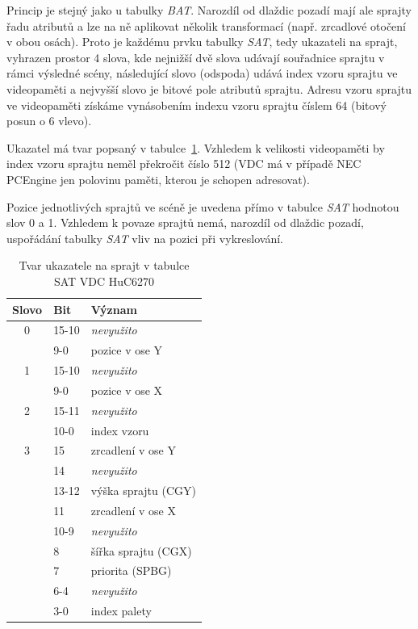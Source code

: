\begin{description}
	Princip je stejný jako u tabulky {\it BAT}. Narozdíl od 
	dlaždic pozadí mají ale sprajty řadu atributů a lze na ně aplikovat několik
	transformací (např. zrcadlové otočení v obou osách). Proto je každému prvku
	tabulky {\it SAT}, tedy ukazateli na sprajt, vyhrazen prostor
	4 slova, kde nejnižší dvě slova udávají souřadnice sprajtu v rámci výsledné
	scény, následující slovo (odspoda) udává index vzoru sprajtu ve videopaměti
	a nejvyšší slovo je bitové pole atributů sprajtu. Adresu vzoru sprajtu ve
	videopaměti získáme vynásobením indexu vzoru sprajtu číslem 64 (bitový
	posun o 6 vlevo).
	
	Ukazatel má tvar popsaný v tabulce~\ref{tab:vdc_sat4word}. Vzhledem k
	velikosti videopaměti by index vzoru sprajtu neměl překročit číslo 512 (VDC
	má v případě NEC PCEngine jen polovinu paměti, kterou je schopen
	adresovat).~\cite{Schleussinger98}

	Pozice jednotlivých sprajtů ve scéně je uvedena přímo v tabulce {\it SAT}
	hodnotou slov 0 a 1. Vzhledem k povaze sprajtů nemá, narozdíl od dlaždic
	pozadí, uspořádání tabulky {\it SAT} vliv na pozici při vykreslování.

	\begin{table}[ht]
	\begin{center}
	\begin{tabular}{|c|l|l|}
	\hline
	\textbf{Slovo} & \textbf{Bit} & \textbf{Význam} \\
	\hline
	0
		& 15-10 & {\em nevyužito} \\
		& 9-0 & pozice v ose Y \\
	\hline
	1
		& 15-10 & {\em nevyužito} \\
		& 9-0 & pozice v ose X \\
	\hline
	2
		& 15-11 & {\em nevyužito} \\
		& 10-0 & index vzoru \\
	\hline
	3
		& 15 & zrcadlení v ose Y \\
		& 14 & {\em nevyužito} \\
		& 13-12 & výška sprajtu (CGY) \\
		& 11 & zrcadlení v ose X \\
		& 10-9 & {\em nevyužito} \\
		& 8 & šířka sprajtu (CGX)\\
		& 7 & priorita (SPBG) \\
		& 6-4 & {\em nevyužito} \\
		& 3-0 & index palety \\
	\hline
	\end{tabular}
	\end{center}
	\caption{Tvar ukazatele na sprajt v tabulce SAT VDC
		HuC6270\label{tab:vdc_sat4word}}
	\end{table}


\end{description}
